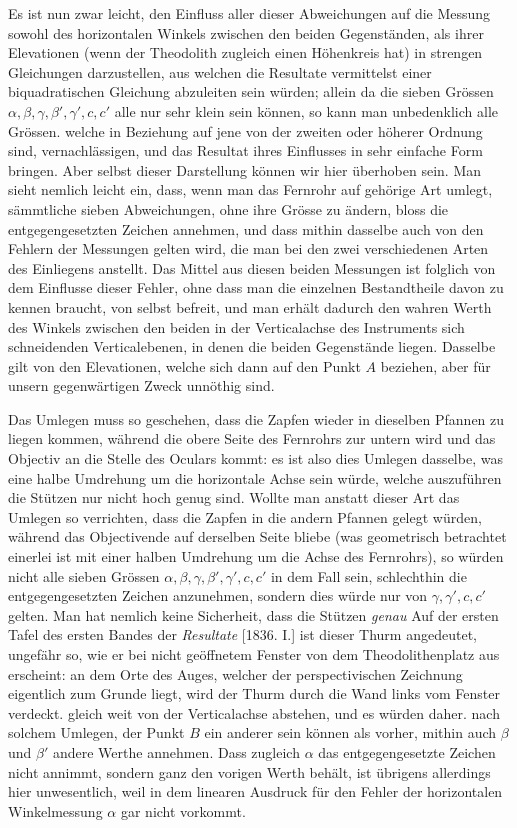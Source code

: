 Es ist nun zwar leicht, den Einfluss aller dieser Abweichungen auf die Messung sowohl des horizontalen Winkels zwischen den beiden Gegenständen, als ihrer Elevationen (wenn der Theodolith zugleich einen Höhenkreis hat) in strengen Gleichungen darzustellen, aus welchen die Resultate vermittelst einer biquadratischen Gleichung abzuleiten sein würden; allein da die sieben Grössen $\alpha,\beta,\gamma,\beta',\gamma',c,c'$ alle nur sehr klein sein können, so kann man unbedenklich alle Grössen. welche in Beziehung auf jene von der zweiten oder höherer Ordnung sind, vernachlässigen, und das Resultat ihres Einflusses in sehr einfache Form bringen. Aber selbst dieser Darstellung können wir hier überhoben sein. Man sieht nemlich leicht ein, dass, wenn man das Fernrohr auf gehörige Art umlegt, sämmtliche sieben Abweichungen, ohne ihre Grösse zu ändern, bloss die entgegengesetzten Zeichen annehmen, und dass mithin dasselbe auch von den Fehlern der Messungen gelten wird, die man bei den zwei verschiedenen Arten des Einliegens anstellt. Das Mittel aus diesen beiden Messungen ist folglich von dem Einflusse dieser Fehler, ohne dass man die einzelnen Bestandtheile davon zu kennen braucht, von selbst befreit, und man erhält dadurch den wahren Werth des Winkels zwischen den beiden in der Verticalachse des Instruments sich schneidenden Verticalebenen, in denen die beiden Gegenstände liegen. Dasselbe gilt von den Elevationen, welche sich dann auf den Punkt $A$ beziehen, aber für unsern gegenwärtigen Zweck unnöthig sind.

Das Umlegen muss so geschehen, dass die Zapfen wieder in dieselben Pfannen zu liegen kommen, während die obere Seite des Fernrohrs zur untern wird und das Objectiv an die Stelle des Oculars kommt: es ist also dies Umlegen dasselbe, was eine halbe Umdrehung um die horizontale Achse sein würde, welche auszuführen die Stützen nur nicht hoch genug sind. Wollte man anstatt dieser Art das Umlegen so verrichten, dass die Zapfen in die andern Pfannen gelegt würden, während das Objectivende auf derselben Seite bliebe (was geometrisch betrachtet einerlei ist mit einer halben Umdrehung um die Achse des Fernrohrs), so würden nicht alle sieben Grössen $\alpha,\beta,\gamma,\beta',\gamma',c,c'$ in dem Fall sein, schlechthin die entgegengesetzten Zeichen anzunehmen, sondern dies würde nur von $\gamma,\gamma',c,c'$ gelten. Man hat nemlich keine Sicherheit, dass die Stützen \textit{genau}
\expandafter\def\csname HistoricalNoteText445\endcsname{Auf der ersten Tafel des ersten Bandes der \textit{Resultate} [1836. I.] ist dieser Thurm angedeutet, ungefähr so, wie er bei nicht geöffnetem Fenster von dem Theodolithenplatz aus erscheint: an dem Orte des Auges, welcher der perspectivischen Zeichnung eigentlich zum Grunde liegt, wird der Thurm durch die Wand links vom Fenster verdeckt.}%
gleich weit von der Verticalachse abstehen, und es würden daher. nach solchem Umlegen, der Punkt $B$ ein anderer sein können als vorher, mithin auch $\beta$ und $\beta'$ andere Werthe annehmen. Dass zugleich $\alpha$ das entgegengesetzte Zeichen nicht annimmt, sondern ganz den vorigen Werth behält, ist übrigens allerdings hier unwesentlich, weil in dem linearen Ausdruck für den Fehler der horizontalen Winkelmessung $\alpha$ gar nicht vorkommt.

